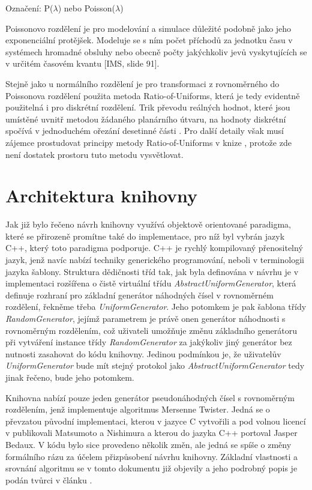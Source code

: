 \documentclass[a4paper,11pt]{article}
\begin{document}
Označení: P($\lambda$) nebo Poisson($\lambda$)

Poissonovo rozdělení je pro modelování a simulace důležité podobně jako jeho exponenciální protějšek. Modeluje se s ním počet příchodů za jednotku času v systémech hromadné obsluhy nebo obecně počty jakýchkoliv jevů vyskytujících se v určitém časovém kvantu [IMS, slide 91]. 

Stejně jako u normálního rozdělení je pro transformaci z rovnoměrného do Poissonova rozdělení použita metoda Ratio-of-Uniforms, která je tedy evidentně použitelná i pro diskrétní rozdělení. Trik převodu reálných hodnot, které jsou umístěné uvnitř metodou žádaného planárního útvaru, na hodnoty diskrétní spočívá v jednoduchém ořezání desetinné části \cite{NR}. Pro další detaily však musí zájemce prostudovat principy metody Ratio-of-Uniforms v knize \cite{NR}, protože zde není dostatek prostoru tuto metodu vysvětlovat.

\section{Architektura knihovny}

Jak již bylo řečeno návrh knihovny využívá objektově orientované paradigma, které se přirozeně promítne také do implementace, pro níž byl vybrán jazyk C++, který toto paradigma podporuje. C++ je rychlý kompilovaný přenositelný jazyk, jenž navíc nabízí techniky generického programování, neboli v terminologii jazyka šablony. Struktura dědičnosti tříd tak, jak byla definována v návrhu je v implementaci rozšířena o čistě virtuální třídu \emph{AbstractUniformGenerator}, která definuje rozhraní pro základní generátor náhodných čísel v rovnoměrném rozdělení, řekněme třeba \emph{UniformGenerator}. Jeho potomkem je pak šablona třídy \emph{RandomGenerator}, jejímž parametrem je právě onen generátor náhodnosti s rovnoměrným rozdělením, což uživateli umožňuje změnu základního generátoru při vytváření instance třídy \emph{RandomGenerator} za jakýkoliv jiný generátor bez nutnosti zasahovat do kódu knihovny. Jedinou podmínkou je, že uživatelův \emph{UniformGenerator} bude mít stejný protokol jako \emph{AbstractUniformGenerator} tedy jinak řečeno, bude jeho potomkem.

Knihovna nabízí pouze jeden generátor pseudonáhodných čísel s rovnoměrným rozdělením, jenž implementuje algoritmus Mersenne Twister. Jedná se o převzatou původní implementaci, kterou v jazyce C vytvořili a pod volnou licencí v \cite{Matsumoto} publikovali Matsumoto a Nishimura a kterou do jazyka C++ portoval Jasper Bedaux. V kódu bylo sice provedeno několik změn, ale jedná se spíše o změny formálního rázu za účelem přizpůsobení návrhu knihovny. Základní vlastnosti a srovnání algoritmu se v tomto dokumentu již objevily a jeho podrobný popis je podán tvůrci v článku \cite{Matsumoto}.
\end{document}
